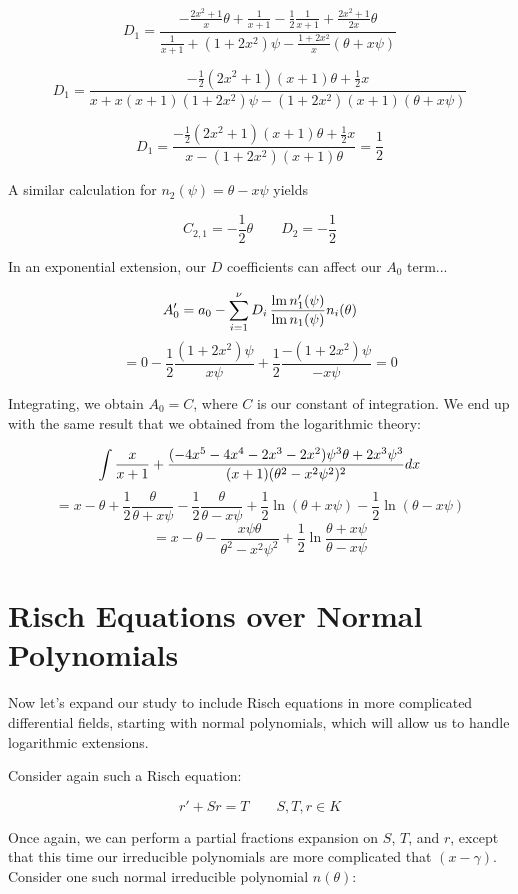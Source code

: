 $$ D_1 = \frac{- \frac{2x^2+1}{x}\theta + \frac{1}{x+1} - \frac{1}{2}\frac{1}{x+1} + \frac{2x^2 + 1}{2x} \theta}{\frac{1}{x+1} + (1 + 2x^2)\psi - \frac{1+2x^2}{x}(\theta + x \psi)}$$

$$ D_1 = \frac{- \frac{1}{2}(2x^2+1)(x+1)\theta + \frac{1}{2} x}{x + x(x+1)(1 + 2x^2)\psi - (1+2x^2)(x+1)(\theta + x \psi)}$$

$$ D_1 = \frac{- \frac{1}{2}(2x^2+1)(x+1)\theta + \frac{1}{2} x}{x - (1+2x^2)(x+1)\theta} = \frac{1}{2}$$

A similar calculation for $n_2(\psi) = \theta - x \psi$ yields

$$ C_{2,1} = - \frac{1}{2} \theta \qquad D_2 = - \frac{1}{2}$$

In an exponential extension, our $D$ coefficients can affect our $A_0$ term...

$$A_0' = a_0 - \sum_{i=1}^\nu D_i \,\frac{{\rm lm\,} n_1'(\psi)}{{\rm lm\,} n_1(\psi)} n_i(\theta)$$
$$ = 0 - \frac{1}{2} \frac{(1+2x^2)\psi}{x\psi} + \frac{1}{2} \frac{-(1+2x^2)\psi}{- x\psi} = 0$$

Integrating, we obtain $A_0 = C$, where $C$ is our constant of integration.  We end up with
the same result that we obtained from the logarithmic theory:

$$\int {x\over{x+1}} + {{(-4x^5-4x^4-2x^3-2x^2)\psi^3\theta + {2x^3}\psi^3}\over{(x+1)(\theta^2 - x^2\psi^2)^2}} dx$$
$$= x - \theta + \frac{1}{2}\frac{\theta}{\theta + x \psi} - \frac{1}{2}\frac{\theta}{\theta - x \psi}
+ \frac{1}{2} \ln (\theta + x \psi) - \frac{1}{2} \ln (\theta - x \psi) $$
$$= x - \theta - \frac{x \psi \theta}{\theta^2 - x^2 \psi^2}
+ \frac{1}{2} \ln \frac{\theta + x \psi}{\theta - x \psi}$$


\endexample

\vfill\eject
\section{Risch Equations over Normal Polynomials}

Now let's expand our study to include Risch equations in more
complicated differential fields, starting with normal polynomials,
which will allow us to handle logarithmic extensions.

Consider again such a Risch equation:

$$r' + S r = T \qquad S,T,r \in K$$

Once again, we can perform a partial fractions expansion on $S$, $T$,
and $r$, except that this time our irreducible polynomials are more
complicated that $(x-\gamma)$.  Consider one such normal irreducible
polynomial $n(\theta)$:

